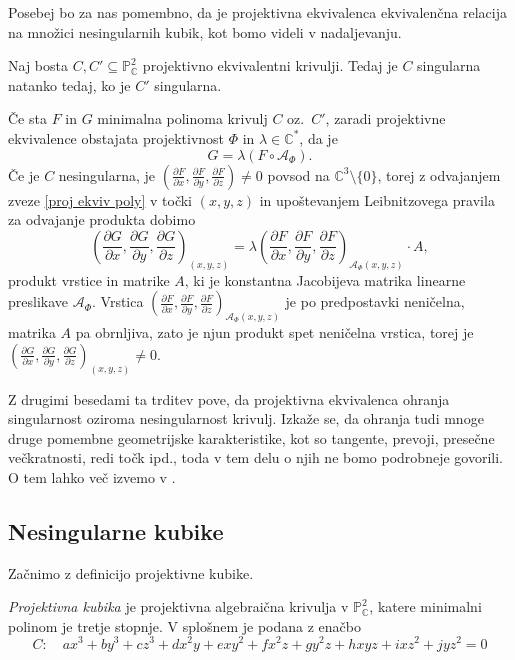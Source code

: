 \documentclass[mat1]{fmfdelo}
\numberwithin{equation}{section}
\newcommand{\C}{\mathbb C}
\newcommand{\CM}{\mathbb C ^*}
\newcommand{\PC}{\mathbb{P}^2_\C}
\newcommand{\pdv}[2][]{\frac{\partial#1}{\partial#2}}
\theoremstyle{definition}
\begin{document}
Posebej bo za nas pomembno, da je projektivna ekvivalenca ekvivalenčna relacija na množici nesingularnih kubik, kot bomo videli v nadaljevanju. 

\begin{trditev}
    Naj bosta $C, C' \subseteq \PC$ projektivno ekvivalentni krivulji. Tedaj je $C$ singularna natanko tedaj, ko je $C'$ singularna. 
\end{trditev}

\begin{dokaz}
    Če sta $F$ in $G$ minimalna polinoma krivulj $C$ oz.\ $C'$, zaradi projektivne ekvivalence obstajata projektivnost $\Phi$ in $\lambda \in \CM$, da je
    \begin{equation}
        \label{proj ekviv poly}
        G = \lambda (F \circ \mathcal{A}_\Phi).
    \end{equation}
    Če je $C$ nesingularna, je $\left(\pdv[F]{x}{}, \pdv[F]{y}{}, \pdv[F]{z}{}\right) \neq 0$ povsod na $\C^3\setminus\{0\}$, torej z odvajanjem zveze \ref{proj ekviv poly} v točki $(x,y,z)$ in upoštevanjem Leibnitzovega pravila za odvajanje produkta dobimo
    \[
        \left(\pdv[G]{x}{}, \pdv[G]{y}{}, \pdv[G]{z}{}\right)_{(x,y,z)} = 
        \lambda \left(\pdv[F]{x}{}, \pdv[F]{y}{}, \pdv[F]{z}{}\right)_{\mathcal{A}_\Phi (x,y,z)} \cdot A,
    \]
    produkt vrstice in matrike $A$, ki je konstantna Jacobijeva matrika linearne preslikave $\mathcal{A}_\Phi$. Vrstica $\left(\pdv[F]{x}{}, \pdv[F]{y}{}, \pdv[F]{z}{}\right)_{\mathcal{A}_\Phi (x,y,z)}$ je po predpostavki neničelna, matrika $A$ pa obrnljiva, zato je njun produkt spet neničelna vrstica, torej je $\left(\pdv[G]{x}{}, \pdv[G]{y}{}, \pdv[G]{z}{}\right)_{(x,y,z)} \neq 0$. 
\end{dokaz}

Z drugimi besedami ta trditev pove, da projektivna ekvivalenca ohranja singularnost oziroma nesingularnost krivulj. Izkaže se, da ohranja tudi mnoge druge pomembne geometrijske karakteristike, kot so tangente, prevoji, presečne večkratnosti, redi točk ipd., toda v tem delu o njih ne bomo podrobneje govorili. O tem lahko več izvemo v \cite{Gibson}.


\subsection{Nesingularne kubike}\label{nesingularne kubike}
Začnimo z definicijo projektivne kubike. 

\begin{definicija}
    \emph{Projektivna kubika} je projektivna algebraična krivulja v $\PC$, katere minimalni polinom je tretje stopnje. 
    V splošnem je podana z enačbo
    \[
        C: \quad ax^3 + by^3 + cz^3 + dx^2y + exy^2 + fx^2z + gy^2z + hxyz + ixz^2 + jyz^2 = 0
    \]
\end{definicija}
\end{document}
